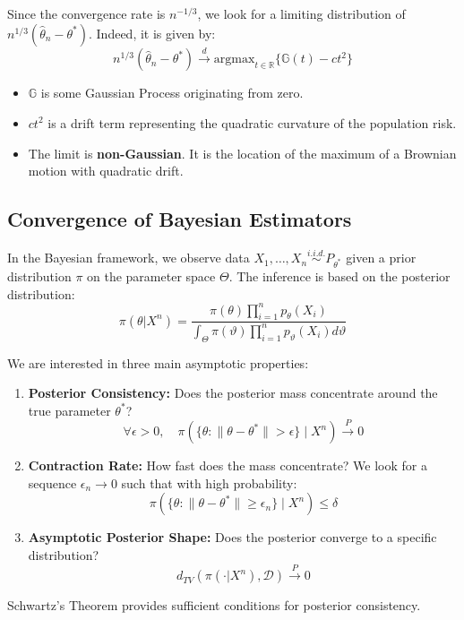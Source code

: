 \begin{remark}
    Since the convergence rate is $n^{-1/3}$, we look for a limiting distribution of $n^{1/3}(\hat{\theta}_n - \theta^*)$. Indeed, it is given by:
$$
n^{1/3}(\hat{\theta}_n - \theta^*) \xrightarrow{d} \text{argmax}_{t \in \mathbb{R}} \{ \mathbb{G}(t) - ct^2 \}
$$
\begin{itemize}
    \item $\mathbb{G}$ is some Gaussian Process originating from zero.
    \item $ct^2$ is a drift term representing the quadratic curvature of the population risk.
    \item The limit is \textbf{non-Gaussian}. It is the location of the maximum of a Brownian motion with quadratic drift.
\end{itemize}
\end{remark}

\subsection{Convergence of Bayesian Estimators}
In the Bayesian framework, we observe data $X_1, \dots, X_n \overset{i.i.d.}{\sim} P_{\theta^*}$ given a prior distribution $\pi$ on the parameter space $\Theta$. The inference is based on the posterior distribution:
$$
\pi(\theta | X^n) = \frac{\pi(\theta) \prod_{i=1}^n p_\theta(X_i)}{\int_\Theta \pi(\vartheta) \prod_{i=1}^n p_\vartheta(X_i) d\vartheta}
$$

We are interested in three main asymptotic properties:
\begin{enumerate}
    \item \textbf{Posterior Consistency:} Does the posterior mass concentrate around the true parameter $\theta^*$?
    $$
    \forall \epsilon > 0, \quad \pi(\{\theta : \|\theta - \theta^*\| > \epsilon\} \mid X^n) \xrightarrow{P} 0
    $$
    \item \textbf{Contraction Rate:} How fast does the mass concentrate? We look for a sequence $\epsilon_n \to 0$ such that with high probability:
    $$
    \pi(\{\theta : \|\theta - \theta^*\| \ge \epsilon_n\} \mid X^n) \le \delta
    $$
    \item \textbf{Asymptotic Posterior Shape:} Does the posterior converge to a specific distribution?
    $$
    d_{TV}(\pi(\cdot | X^n), \mathcal{D}) \xrightarrow{P} 0
    $$
\end{enumerate}

Schwartz's Theorem provides sufficient conditions for posterior consistency.

